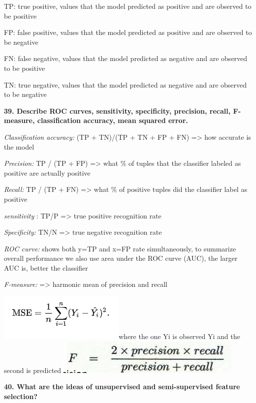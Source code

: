 TP: true positive, values that the model predicted as positive and are
observed to be positive

FP: false positive, values that the model predicted as positive and are
observed to be negative

FN: false negative, values that the model predicted as negative and are
observed to be positive

TN: true negative, values that the model predicted as negative and are
observed to be negative

\textbf{39. Describe ROC curves, sensitivity, specificity, precision,
recall, F-measure, classification accuracy, mean squared error.}

\textit{Classification accuracy:} (TP + TN)/(TP + TN + FP + FN)
=\textgreater{} how accurate is the model

\textit{Precision:} TP / (TP + FP) =\textgreater{} what \% of tuples
that the classifier labeled as positive are actually positive

\textit{Recall:} TP / (TP + FN) =\textgreater{} what \% of positive
tuples did the classifier label as positive

\textit{sensitivity} : TP/P =\textgreater{} true positive recognition
rate

\textit{Specificity:} TN/N =\textgreater{} true negative recognition
rate

\textit{ROC curve:} shows both y=TP and x=FP rate simultaneously, to
summarize overall performance we also use area under the ROC curve
(AUC), the larger AUC is, better the classifier

\textit{F-measure:} =\textgreater{} harmonic mean of precision and
recall

\includegraphics[width=2.42708in,height=0.90625in]{media/image12.png}where
the one Yi is observed Yi and the second is
predicted
\includegraphics[width=\columnwidth]{media/image38.png}

\textbf{40. What are the ideas of unsupervised and semi-supervised
feature selection?}

